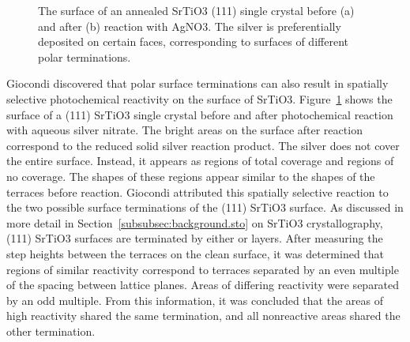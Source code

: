 \documentclass[12pt,%
              twoside,
               letterpaper]{uiothesis}
\begin{document}
\begin{figure}
\begin{center}
\caption[Surface of an annealed SrTiO3 (111) single crystal]{%
	The surface of an annealed SrTiO3 (111) single crystal before 
	(a) and after (b) reaction with AgNO3. The silver is preferentially 
	deposited on certain faces, corresponding to surfaces of different 
	polar terminations.\cite{Giocondi:2003wc}}
\label{fig:giocondi}
\end{center}
\end{figure}
Giocondi\cite{Giocondi:2003wc} discovered that polar surface terminations can also result
in spatially selective photochemical reactivity on the surface of SrTiO3.
Figure~\ref{fig:giocondi} shows the surface of a (111) SrTiO3 single crystal before and
after photochemical reaction with aqueous silver nitrate. The bright areas on the surface
after reaction correspond to the reduced solid silver reaction product. The silver does
not cover the entire surface. Instead, it appears as regions of total coverage and regions
of no coverage. The shapes of these regions appear similar to the shapes of the terraces
before reaction. Giocondi attributed this spatially selective reaction to the two possible
surface terminations of the (111) SrTiO3 surface. As discussed in more detail in
Section~\ref{subsubsec:background.sto} on SrTiO3 crystallography, (111) SrTiO3
surfaces are terminated by either  or  layers. After measuring
the step heights between the terraces on the clean surface, it was determined that regions
of similar reactivity correspond to terraces separated by an even multiple of the spacing
between lattice planes. Areas of differing reactivity were separated by an odd multiple.
From this information, it was concluded that the areas of high reactivity shared the same
termination, and all nonreactive areas shared the other termination.
\end{document}
